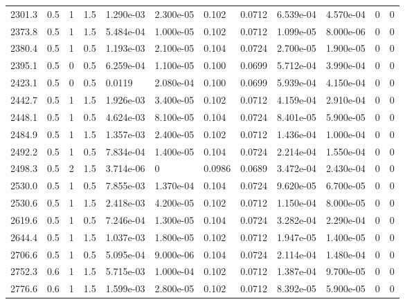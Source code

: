 \documentclass[preview]{standalone}
\begin{document}
{{{\begin{tabular}{L{1.2cm}C{1.2cm} C{0.3cm}C{0.5cm} C{1.4cm}C{1.4cm} C{1.4cm}C{1.4cm} C{1.6cm}C{1.6cm} C{1.6cm}C{1.6cm}}
  2301.3  &   0.5  & 1     & 1.5 &  1.290e-03  & 2.300e-05  &  0.102&   0.0712& 6.539e-04 & 4.570e-04   &  0 & 0  \\ 
  2373.8  &   0.5  & 1     & 1.5 &  5.484e-04  & 1.000e-05  &  0.102&   0.0712& 1.099e-05 & 8.000e-06   &  0 & 0  \\ 
  2380.4  &   0.5  & 1     & 0.5 &  1.193e-03  & 2.100e-05  &  0.104&   0.0724& 2.700e-05 & 1.900e-05   &  0 & 0  \\ 
  2395.1  &   0.5  & 0     & 0.5 &  6.259e-04  & 1.100e-05  &  0.100&   0.0699& 5.712e-04 & 3.990e-04   &  0 & 0  \\ 
  2423.1  &   0.5  & 0     & 0.5 &  0.0119  & 2.080e-04  &  0.100&   0.0699& 5.939e-04 & 4.150e-04   &  0 & 0  \\ 
  2442.7  &   0.5  & 1     & 1.5 &  1.926e-03  & 3.400e-05  &  0.102&   0.0712& 4.159e-04 & 2.910e-04   &  0 & 0  \\ 
  2448.1  &   0.5  & 1     & 0.5 &  4.624e-03  & 8.100e-05  &  0.104&   0.0724& 8.401e-05 & 5.900e-05   &  0 & 0  \\ 
  2484.9  &   0.5  & 1     & 1.5 &  1.357e-03  & 2.400e-05  &  0.102&   0.0712& 1.436e-04 & 1.000e-04   &  0 & 0  \\ 
  2492.2  &   0.5  & 1     & 0.5 &  7.834e-04  & 1.400e-05  &  0.104&   0.0724& 2.214e-04 & 1.550e-04   &  0 & 0  \\ 
  2498.3  &   0.5  & 2     & 1.5 &  3.714e-06  & 0  &  0.0986&   0.0689& 3.472e-04 & 2.430e-04   &  0 & 0  \\ 
  2530.0  &   0.5  & 1     & 0.5 &  7.855e-03  & 1.370e-04  &  0.104&   0.0724& 9.620e-05 & 6.700e-05   &  0 & 0  \\ 
  2530.6  &   0.5  & 1     & 1.5 &  2.418e-03  & 4.200e-05  &  0.102&   0.0712& 1.150e-04 & 8.000e-05   &  0 & 0  \\ 
  2619.6  &   0.5  & 1     & 0.5 &  7.246e-04  & 1.300e-05  &  0.104&   0.0724& 3.282e-04 & 2.290e-04   &  0 & 0  \\ 
  2644.4  &   0.5  & 1     & 1.5 &  1.037e-03  & 1.800e-05  &  0.102&   0.0712& 1.947e-05 & 1.400e-05   &  0 & 0  \\ 
  2706.6  &   0.5  & 1     & 0.5 &  5.095e-04  & 9.000e-06  &  0.104&   0.0724& 2.114e-04 & 1.480e-04   &  0 & 0  \\ 
  2752.3  &   0.6  & 1     & 1.5 &  5.715e-03  & 1.000e-04  &  0.102&   0.0712& 1.387e-04 & 9.700e-05   &  0 & 0  \\ 
  2776.6  &   0.6  & 1     & 1.5 &  1.599e-03  & 2.800e-05  &  0.102&   0.0712& 8.392e-05 & 5.900e-05   &  0 & 0  \\ 

\end{tabular}}}}
\end{document}
